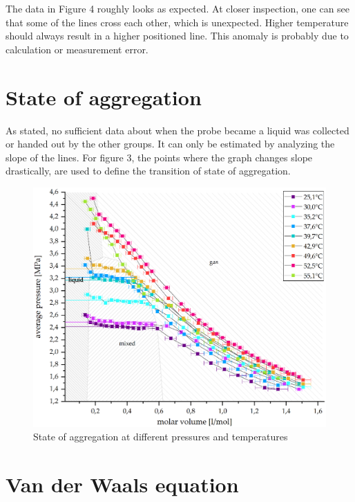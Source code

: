 \documentclass[10pt,a4paper]{article}
\begin{document}
The data in Figure 4 roughly looks as expected. At closer inspection, one can see that some of the lines cross each other, which is unexpected. Higher temperature should always result in a higher positioned line. This anomaly is probably due to calculation or measurement error. 

\section{State of aggregation}

As stated, no sufficient data about when the probe became a liquid was collected or handed out by the other groups. It can only be estimated by analyzing the slope of the lines. For figure 3, the points where the graph changes slope drastically, are used to define the transition of state of aggregation.

\begin{figure}[hbt!]
\includegraphics[width=400pt, center]{isobaresArea.eps}
\caption{State of aggregation at different pressures and temperatures}
\label{fig:length_eight_mouse}
\end{figure}


\section{Van der Waals equation}
\end{document}
